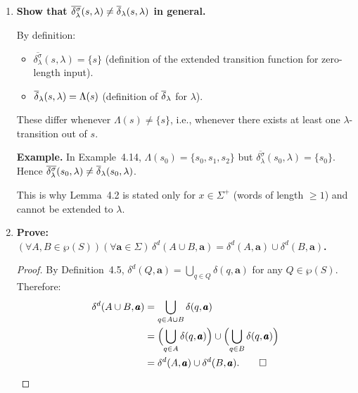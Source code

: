 \begin{enumerate}[{4.}1.]
\begin{proof}
\emph{Base:} $\DBAR^n(s_0,\lambda)=\{s_0\}=\{\deltabar{}(s_0,\lambda)\}$.

\emph{Step:} $\DBAR^n(s_0,x\pmb{a})
=\bigcup_{t\in\DBAR^n(s_0,x)}\delta^n(t,\pmb{a})
=\bigcup_{t\in\{\deltabar{}(s_0,x)\}}\{\delta(t,\pmb{a})\}
=\{\delta(\deltabar{}(s_0,x),\pmb{a})\}
=\{\deltabar{}(s_0,x\pmb{a})\}$.

Hence $x\in L(A^n)$ iff $\DBAR^n(s_0,x)\cap F\neq\emptyset$ iff
$\deltabar{}(s_0,x)\in F$ iff $x\in L(A)$. \qed
\end{proof}

\item \textbf{Show that $\overline{\delta^{\sigma}_\lambda}(s,\lambda)\neq\overline{\delta}_\lambda(s,\lambda)$ in general.}

By definition:
\begin{itemize}
  \item $\overline{\delta^{\sigma}_\lambda}(s,\lambda)=\{s\}$ (definition of
    the extended transition function for zero-length input).
  \item $\overline{\delta}_\lambda(s,\lambda)=\Lambda(s)$ (definition of $\overline{\delta}_\lambda$ for $\lambda$).
\end{itemize}

These differ whenever $\Lambda(s)\neq\{s\}$, i.e., whenever there exists at
least one $\lambda$-transition out of $s$.

\textbf{Example.}  In Example~4.14, $\Lambda(s_0)=\{s_0,s_1,s_2\}$ but
$\overline{\delta^{\sigma}_\lambda}(s_0,\lambda)=\{s_0\}$.  Hence
$\overline{\delta^{\sigma}_\lambda}(s_0,\lambda)\neq\overline{\delta}_\lambda(s_0,\lambda)$.

This is why Lemma~4.2 is stated only for $x\in\Sigma^+$ (words of length
$\ge 1$) and cannot be extended to $\lambda$.

\item \textbf{Prove: $(\forall A,B\in\wp(S))(\forall\pmb{a}\in\Sigma)\,
\delta^d(A\cup B,\pmb{a})=\delta^d(A,\pmb{a})\cup\delta^d(B,\pmb{a})$.}

\begin{proof}
By Definition~4.5, $\delta^d(Q,\pmb{a})=\bigcup_{q\in Q}\delta(q,\pmb{a})$
for any $Q\in\wp(S)$.  Therefore:
\begin{align*}
  \delta^d(A\cup B,\pmb{a})
  &= \bigcup_{q\in A\cup B}\delta(q,\pmb{a}) \\
  &= \Bigl(\bigcup_{q\in A}\delta(q,\pmb{a})\Bigr)\cup\Bigl(\bigcup_{q\in B}\delta(q,\pmb{a})\Bigr) \\
  &= \delta^d(A,\pmb{a})\cup\delta^d(B,\pmb{a}). \qed
\end{align*}
\end{proof}


\end{enumerate}
